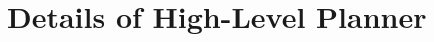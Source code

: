 % 






% 


% 




\renewcommand{\thefigure}{S\arabic{figure}}
\renewcommand{\thetable}{S\arabic{table}}
\def\theequation{S\arabic{equation}}
\setcounter{page}{1}
\setcounter{section}{0}
\setcounter{equation}{0}
\setcounter{table}{0}
\setcounter{figure}{0}
\maketitlesupplementary

\renewcommand{\thesection}{\Alph{section}}
\renewcommand{\thesubsection}{\thesection.\arabic{subsection}}
\setcounter{tocdepth}{2}



\section{Details of High-Level Planner}



